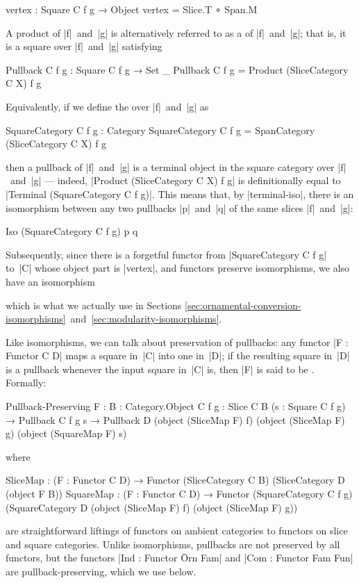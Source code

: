 \begin{code}
vertex : Square C f g → Object
vertex = Slice.T ∘ Span.M
\end{code}
A product of |f|~and~|g| is alternatively referred to as a  of |f|~and~|g|; that is, it is a square over |f|~and~|g| satisfying
\begin{code}
Pullback C f g : Square C f g → Set _
Pullback C f g = Product (SliceCategory C X) f g
\end{code}
Equivalently, if we define the  over |f|~and~|g| as
\begin{code}
SquareCategory C f g : Category
SquareCategory C f g = SpanCategory (SliceCategory C X) f g
\end{code}
then a pullback of |f|~and~|g| is a terminal object in the square category over |f|~and~|g| --- indeed, |Product (SliceCategory C X) f g| is definitionally equal to |Terminal (SquareCategory C f g)|.
This means that, by |terminal-iso|, there is an isomorphism between any two pullbacks |p|~and~|q| of the same slices |f|~and~|g|:
\begin{code}
Iso (SquareCategory C f g) p q
\end{code}
Subsequently, since there is a forgetful functor from |SquareCategory C f g| to~|C| whose object part is |vertex|, and functors preserve isomorphisms, we also have an isomorphism
which is what we actually use in Sections \ref{sec:ornamental-conversion-isomorphisms}~and~\ref{sec:modularity-isomorphisms}.

Like isomorphisms, we can talk about preservation of pullbacks: any functor |F : Functor C D| maps a square in~|C| into one in~|D|; if the resulting square in~|D| is a pullback whenever the input square in~|C| is, then |F| is said to be .
Formally:
\begin{code}
Pullback-Preserving F :
  {B : Category.Object C} {f g : Slice C B} (s : Square C f g) →
  Pullback C f g s → Pullback D  (object (SliceMap F) f) (object (SliceMap F) g)
                                 (object (SquareMap F) s)
\end{code}
where
\begin{code}
SliceMap   :  (F : Functor C D) →
              Functor (SliceCategory C B) (SliceCategory D (object F B))
SquareMap  :  (F : Functor C D) →
              Functor  (SquareCategory C f g)
                       (SquareCategory D  (object (SliceMap F) f)
                                          (object (SliceMap F) g))
\end{code}
are straightforward liftings of functors on ambient categories to functors on slice and square categories.
Unlike isomorphisms, pullbacks are not preserved by all functors, but the functors |Ind : Functor Ōrn Fam| and |Com : Functor Fam Fun| are pullback-preserving, which we use below.

